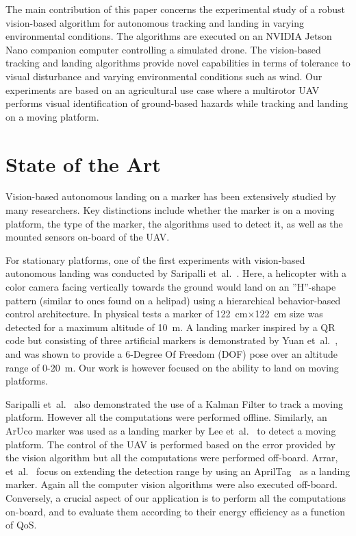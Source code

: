\documentclass[conference, onecolumn, draftclsnofoot]{IEEEtran}
\begin{document}

The main contribution of this paper concerns the experimental study of
a robust vision-based algorithm for autonomous
tracking and landing in varying environmental conditions. The
algorithms are executed on an NVIDIA Jetson Nano companion computer
controlling a simulated drone. The vision-based tracking and landing
algorithms provide novel capabilities in terms of tolerance to visual
disturbance and varying environmental conditions such as wind.
%
Our experiments are based on an agricultural use case where a
multirotor UAV performs visual identification of ground-based hazards
while tracking and landing on a moving platform.
%




\section{State of the Art}
\label{sec:state-of-the-art}

Vision-based autonomous landing on a marker has been extensively
studied by many researchers. Key distinctions include whether the
marker is on a moving platform, the type of the marker, the algorithms
used to detect it, as well as the mounted sensors on-board of the UAV.

For stationary platforms, one of the first experiments with
vision-based autonomous landing was conducted by Saripalli
et~al.~\cite{saripalli2002vision}. Here, a helicopter with a color
camera facing vertically towards the ground would land on an ”H”-shape
pattern (similar to ones found on a helipad) using a hierarchical
behavior-based control architecture. In physical tests a marker of
\SI{122}{\cm}$\times$\SI{122}{\cm} size was detected for a maximum altitude of \SI{10}{\m}. A
landing marker inspired by a QR code but consisting of three
artificial markers is demonstrated by Yuan
et~al.~\cite{yuan2018hierarchical}, and was shown to provide a 6-Degree Of Freedom (DOF)
pose over an altitude range of 0-\SI{20}{\m}. Our work is however focused on
the ability to land on moving platforms.

Saripalli et~al.~\cite{saripalli2003landing} also demonstrated the use
of a Kalman Filter to track a moving platform. However all the
computations were performed offline. Similarly, an ArUco marker was
used as a landing marker by Lee et~al.~\cite{lee2012autonomous} to
detect a moving platform. The control of the UAV is performed based on
the error provided by the vision algorithm but all the computations
were performed off-board. Arrar, et~al.~\cite{araar2017vision} focus
on extending the detection range by using an
AprilTag~\cite{olson2011apriltag} as a landing marker. Again all the
computer vision algorithms were also executed off-board. Conversely, a crucial
aspect of our application is to perform all the computations on-board,
and to evaluate them according to their energy efficiency as a
function of QoS.
\end{document}
